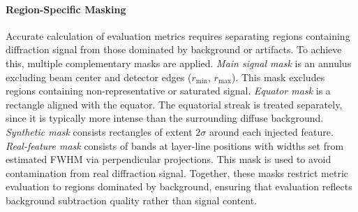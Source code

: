 \documentclass[iucr]{iucrjournals}
\begin{document}
\paragraph{Region-Specific Masking}
Accurate calculation of evaluation metrics requires separating regions containing diffraction signal from those dominated by background or artifacts. To achieve this, multiple complementary masks are applied. \textit{Main signal mask} is an annulus excluding beam center and detector edges ($r_{\mathrm{min}}$, $r_{\mathrm{max}}$). This mask excludes regions containing non-representative or saturated signal. \textit{Equator mask} is a rectangle aligned with the equator. The equatorial streak is treated separately, since it is typically more intense than the surrounding diffuse background. \textit{Synthetic mask} consists rectangles of extent $2\sigma$ around each injected feature. \textit{Real-feature mask} consists of bands at layer-line positions with widths set from estimated FWHM via perpendicular projections. This mask is used to avoid contamination from real diffraction signal. Together, these masks restrict metric evaluation to regions dominated by background, ensuring that evaluation reflects background subtraction quality rather than signal content.




\end{document}
